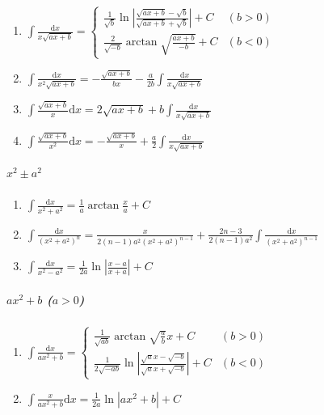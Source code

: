 \begin{tiny}
\begin{enumerate}
\item $ \int \frac{\mathrm{d} x}{x\sqrt{ax+b}} = \begin{cases}
\frac{1}{\sqrt{b}}\ln\left| \frac{\sqrt{ax+b} - \sqrt{b}}{\sqrt{ax+b} + \sqrt{b}} \right| + C & (b>0) \\
\frac{2}{\sqrt{-b}}\arctan\sqrt{\frac{ax+b}{-b}} + C & (b<0)
\end{cases} $

\item $ \int \frac{\mathrm{d} x}{x^2\sqrt{ax+b}} = -\frac{\sqrt{ax+b}}{bx} - \frac{a}{2b} \int \frac{\mathrm{d} x}{x\sqrt{ax+b}} $

\item $ \int \frac{\sqrt{ax+b}}{x}\mathrm{d} x = 2\sqrt{ax+b} + b\int\frac{\mathrm{d} x}{x\sqrt{ax+b}} $

\item $ \int \frac{\sqrt{ax+b}}{x^2}\mathrm{d}x = -\frac{\sqrt{ax+b}}{x} + \frac{a}{2} \int \frac{\mathrm{d}x}{x\sqrt{ax+b}} $

\end{enumerate}

\subparagraph{$x^2 \pm a^2$}

\begin{enumerate}

\item $ \int \frac{\mathrm{d}x}{x^2 + a^2} = \frac{1}{a} \arctan\frac{x}{a} + C$

\item $ \int \frac{\mathrm{d}x}{(x^2+a^2)^n} = \frac{x}{2(n-1)a^2(x^2+a^2)^{n-1}}+\frac{2n-3}{2(n-1)a^2} \int \frac{\mathrm{d}x}{(x^2+a^2)^{n-1}} $

\item $\int \frac{\mathrm{d}x}{x^2-a^2} = \frac{1}{2a}\ln\left| \frac{x-a}{x+a} \right| + C $


\end{enumerate}

\subparagraph{$ax^2+b$ ($a>0$)}

\begin{enumerate}

\item $ \int \frac{\mathrm{d}x}{ax^2+b} = \begin{cases}
\frac{1}{\sqrt{ab}} \arctan \sqrt{\frac{a}{b}} x + C & (b > 0) \\
\frac{1}{2\sqrt{-ab}} \ln\left| \frac{\sqrt{a}x-\sqrt{-b}}{\sqrt{a}x+\sqrt{-b}} \right| + C & (b < 0)
\end{cases} $

\item $ \int \frac{x}{ax^2+b} \mathrm{d}x = \frac{1}{2a} \ln \left| ax^2 + b \right| + C $


\end{enumerate}
\end{tiny}
